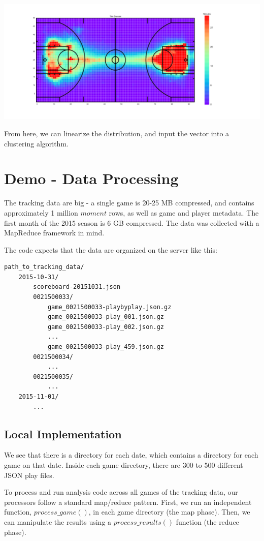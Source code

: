 \documentclass[11pt]{article}
\begin{document}
\hspace*{-1in}
\includegraphics[scale=0.4]{Tim_Duncan_heat_rainbow.pdf}

From here, we can linearize the distribution, and input the vector into a clustering algorithm. 
\section{Demo - Data Processing}
The tracking data are big - a single game is 20-25 MB compressed, and contains approximately 1 million $moment$ rows, as well as game and player metadata. The first month of the 2015 season is 6 GB compressed. The data was collected with a MapReduce framework in mind. 

\noindent The code expects that the data are organized on the server like this:
\begin{footnotesize}
\begin{verbatim}
path_to_tracking_data/
    2015-10-31/
        scoreboard-20151031.json
        0021500033/
            game_0021500033-playbyplay.json.gz
            game_0021500033-play_001.json.gz
            game_0021500033-play_002.json.gz
            ...
            game_0021500033-play_459.json.gz
        0021500034/
            ...
        0021500035/
            ...
    2015-11-01/
        ...
\end{verbatim}
\end{footnotesize}

\subsection*{Local Implementation}

\noindent We see that there is a directory for each date, which contains a directory for each game on that date. Inside each game directory, there are 300 to 500 different JSON play files.

To process and run analysis code across all games of the tracking data, our processors follow a standard map/reduce pattern. First, we run an independent function, $process\_game()$, in each game directory (the map phase). Then, we can manipulate the results using a $process\_results()$ function (the reduce phase).
\end{document}
